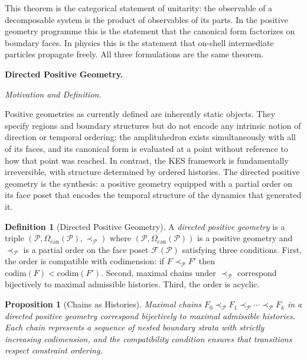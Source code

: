 \documentclass[11pt]{article}
\theoremstyle{plain}
\newtheorem{proposition}[theorem]{Proposition}
\theoremstyle{definition}
\newtheorem{definition}[theorem]{Definition}
\theoremstyle{remark}
\newcommand{\CF}{\Omega_{\mathrm{can}}}
\begin{document}
This theorem is the categorical statement of unitarity: the observable of a decomposable system is the product of observables of its parts. In the positive geometry programme this is the statement that the canonical form factorizes on boundary faces. In physics this is the statement that on-shell intermediate particles propagate freely. All three formulations are the same theorem.

\bigskip\noindent\textbf{Directed Positive Geometry.}
\label{sec:directed}

\medskip\noindent\textit{Motivation and Definition.}

Positive geometries as currently defined are inherently static objects. They specify regions and boundary structures but do not encode any intrinsic notion of direction or temporal ordering: the amplituhedron exists simultaneously with all of its faces, and its canonical form is evaluated at a point without reference to how that point was reached. In contrast, the KES framework is fundamentally irreversible, with structure determined by ordered histories. The directed positive geometry is the synthesis: a positive geometry equipped with a partial order on its face poset that encodes the temporal structure of the dynamics that generated it.

\begin{definition}[Directed Positive Geometry]
\label{def:dpg}
A \emph{directed positive geometry} is a triple $(\mathcal{P}, \CF(\mathcal{P}), \prec_{\mathcal{P}})$ where $(\mathcal{P}, \CF(\mathcal{P}))$ is a positive geometry and $\prec_{\mathcal{P}}$ is a partial order on the face poset $\mathcal{F}(\mathcal{P})$ satisfying three conditions. First, the order is compatible with codimension: if $F \prec_{\mathcal{P}} F'$ then $\mathrm{codim}(F) < \mathrm{codim}(F')$. Second, maximal chains under $\prec_{\mathcal{P}}$ correspond bijectively to maximal admissible histories. Third, the order is acyclic.
\end{definition}

\begin{proposition}[Chains as Histories]
Maximal chains $F_0 \prec_{\mathcal{P}} F_1 \prec_{\mathcal{P}} \cdots \prec_{\mathcal{P}} F_k$ in a directed positive geometry correspond bijectively to maximal admissible histories. Each chain represents a sequence of nested boundary strata with strictly increasing codimension, and the compatibility condition ensures that transitions respect constraint ordering.
\end{proposition}
\end{document}
